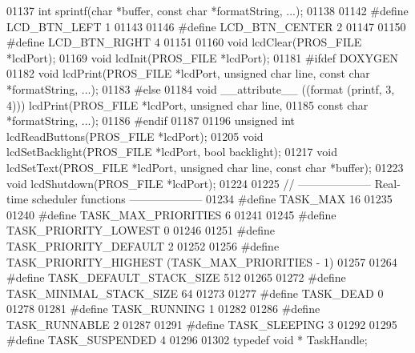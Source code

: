 \begin{DoxyCode}
01137 \textcolor{keywordtype}{int} sprintf(\textcolor{keywordtype}{char} *buffer, \textcolor{keyword}{const} \textcolor{keywordtype}{char} *formatString, ...);
01138 
01142 \textcolor{preprocessor}{#define LCD\_BTN\_LEFT 1}
01143 
01146 \textcolor{preprocessor}{#define LCD\_BTN\_CENTER 2}
01147 
01150 \textcolor{preprocessor}{#define LCD\_BTN\_RIGHT 4}
01151 
01160 \textcolor{keywordtype}{void} lcdClear(PROS_FILE *lcdPort);
01169 \textcolor{keywordtype}{void} lcdInit(PROS_FILE *lcdPort);
01181 \textcolor{preprocessor}{#ifdef DOXYGEN}
01182 \textcolor{keywordtype}{void} lcdPrint(PROS_FILE *lcdPort, \textcolor{keywordtype}{unsigned} \textcolor{keywordtype}{char} line, \textcolor{keyword}{const} \textcolor{keywordtype}{char} *formatString, ...);
01183 \textcolor{preprocessor}{#else}
01184 \textcolor{keywordtype}{void} __attribute__ ((format (printf, 3, 4))) lcdPrint(PROS_FILE *lcdPort, \textcolor{keywordtype}{unsigned} \textcolor{keywordtype}{char} line,
01185        const \textcolor{keywordtype}{char} *formatString, ...);
01186 \textcolor{preprocessor}{#endif}
01187 
01196 \textcolor{keywordtype}{unsigned} \textcolor{keywordtype}{int} lcdReadButtons(PROS_FILE *lcdPort);
01205 \textcolor{keywordtype}{void} lcdSetBacklight(PROS_FILE *lcdPort, \textcolor{keywordtype}{bool} backlight);
01217 \textcolor{keywordtype}{void} lcdSetText(PROS_FILE *lcdPort, \textcolor{keywordtype}{unsigned} \textcolor{keywordtype}{char} line, \textcolor{keyword}{const} \textcolor{keywordtype}{char} *buffer);
01223 \textcolor{keywordtype}{void} lcdShutdown(PROS_FILE *lcdPort);
01224 
01225 \textcolor{comment}{// -------------------- Real-time scheduler functions --------------------}
01234 \textcolor{comment}{}\textcolor{preprocessor}{#define TASK\_MAX 16}
01235 
01240 \textcolor{preprocessor}{#define TASK\_MAX\_PRIORITIES 6}
01241 
01245 \textcolor{preprocessor}{#define TASK\_PRIORITY\_LOWEST 0}
01246 
01251 \textcolor{preprocessor}{#define TASK\_PRIORITY\_DEFAULT 2}
01252 
01256 \textcolor{preprocessor}{#define TASK\_PRIORITY\_HIGHEST (TASK\_MAX\_PRIORITIES - 1)}
01257 
01264 \textcolor{preprocessor}{#define TASK\_DEFAULT\_STACK\_SIZE 512}
01265 
01272 \textcolor{preprocessor}{#define TASK\_MINIMAL\_STACK\_SIZE    64}
01273 
01277 \textcolor{preprocessor}{#define TASK\_DEAD 0}
01278 
01281 \textcolor{preprocessor}{#define TASK\_RUNNING 1}
01282 
01286 \textcolor{preprocessor}{#define TASK\_RUNNABLE 2}
01287 
01291 \textcolor{preprocessor}{#define TASK\_SLEEPING 3}
01292 
01295 \textcolor{preprocessor}{#define TASK\_SUSPENDED 4}
01296 
01302 \textcolor{keyword}{typedef} \textcolor{keywordtype}{void} * TaskHandle;

\end{DoxyCode}

